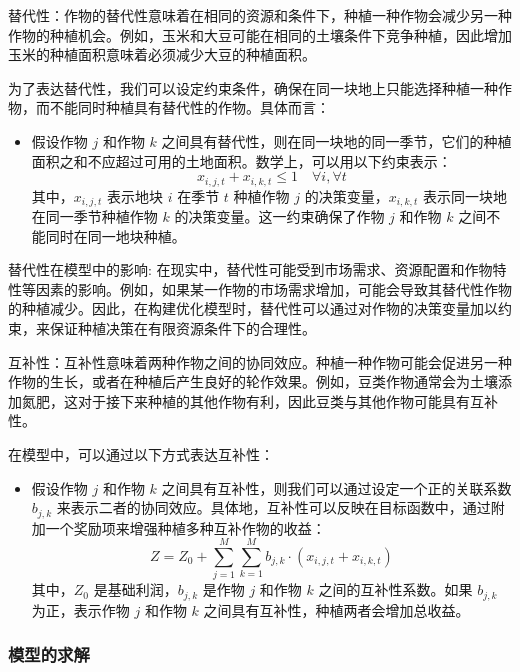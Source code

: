 \documentclass{cumcmthesis}
\begin{document}
替代性：作物的替代性意味着在相同的资源和条件下，种植一种作物会减少另一种作物的种植机会。例如，玉米和大豆可能在相同的土壤条件下竞争种植，因此增加玉米的种植面积意味着必须减少大豆的种植面积。

为了表达替代性，我们可以设定约束条件，确保在同一块地上只能选择种植一种作物，而不能同时种植具有替代性的作物。具体而言：
\begin{itemize}
    \item 假设作物 $j$ 和作物 $k$ 之间具有替代性，则在同一块地的同一季节，它们的种植面积之和不应超过可用的土地面积。数学上，可以用以下约束表示：
    \begin{equation}
    x_{i,j,t} + x_{i,k,t} \leq 1 \quad \forall i, \forall t
    \end{equation}
    其中，$x_{i,j,t}$ 表示地块 $i$ 在季节 $t$ 种植作物 $j$ 的决策变量，$x_{i,k,t}$ 表示同一块地在同一季节种植作物 $k$ 的决策变量。这一约束确保了作物 $j$ 和作物 $k$ 之间不能同时在同一地块种植。
\end{itemize}

替代性在模型中的影响: 在现实中，替代性可能受到市场需求、资源配置和作物特性等因素的影响。例如，如果某一作物的市场需求增加，可能会导致其替代性作物的种植减少。因此，在构建优化模型时，替代性可以通过对作物的决策变量加以约束，来保证种植决策在有限资源条件下的合理性。

互补性：互补性意味着两种作物之间的协同效应。种植一种作物可能会促进另一种作物的生长，或者在种植后产生良好的轮作效果。例如，豆类作物通常会为土壤添加氮肥，这对于接下来种植的其他作物有利，因此豆类与其他作物可能具有互补性。

在模型中，可以通过以下方式表达互补性：
\begin{itemize}
    \item 假设作物 $j$ 和作物 $k$ 之间具有互补性，则我们可以通过设定一个正的关联系数 $b_{j,k}$ 来表示二者的协同效应。具体地，互补性可以反映在目标函数中，通过附加一个奖励项来增强种植多种互补作物的收益：
    \begin{equation}
    Z = Z_0 + \sum_{j=1}^{M} \sum_{k=1}^{M} b_{j,k} \cdot (x_{i,j,t} + x_{i,k,t})
    \end{equation}
    其中，$Z_0$ 是基础利润，$b_{j,k}$ 是作物 $j$ 和作物 $k$ 之间的互补性系数。如果 $b_{j,k}$ 为正，表示作物 $j$ 和作物 $k$ 之间具有互补性，种植两者会增加总收益。
\end{itemize}



\subsubsection{模型的求解}
\end{document}
